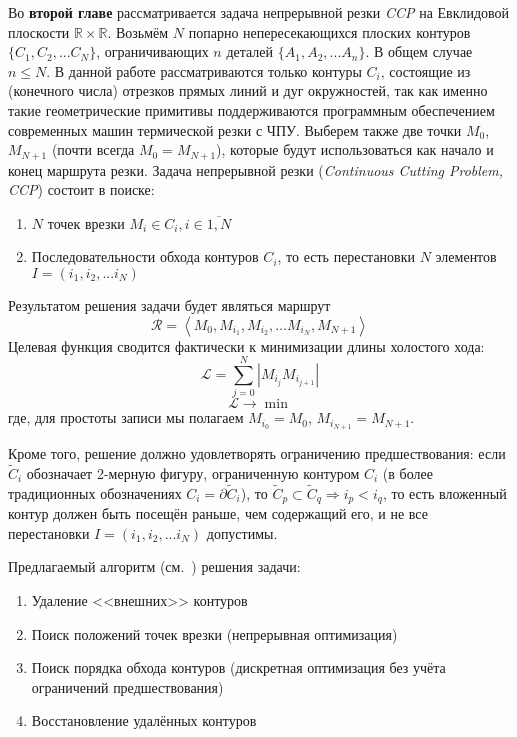 
Во {\bf второй главе}
рассматривается задача непрерывной резки {\it CCP}
на Евклидовой плоскости
$\mathbb R \times \mathbb R$.
Возьмём
$N$
попарно непересекающихся плоских контуров
$\{C_1, C_2, ... C_N\}$,
ограничивающих
$n$
деталей
$\{A_1, A_2, ... A_n\}$.
В общем случае
$n \leqslant N$.
В данной работе рассматриваются только контуры
$C_i$,
состоящие из
(конечного числа)
отрезков прямых линий и дуг окружностей,
так как именно такие геометрические примитивы
поддерживаются программным обеспечением
современных машин термической резки с ЧПУ.
Выберем также две точки
$M_0$, $M_{N + 1}$
(почти всегда $M_0 = M_{N + 1}$),
которые будут использоваться
как начало и конец
маршрута резки.
Задача непрерывной резки
({\it Continuous Cutting Problem, CCP})
состоит в поиске:
\begin{enumerate}
\item
$N$ точек врезки $M_i \in C_i, i \in \overline{1, N}$
\item
Последовательности обхода контуров
$C_i$,
то есть перестановки
$N$
элементов
$I = (i_1, i_2, ... i_N)$
\end{enumerate}
Результатом решения задачи будет являться маршрут
\begin{equation}
  \label{eq:route}
  \mathcal R =
  \left<M_0, M_{i_1}, M_{i_2}, \dots M_{i_N}, M_{N + 1}\right>
\end{equation}
Целевая функция
сводится фактически к минимизации длины холостого хода:
\begin{equation}
  \mathcal{L} = \sum_{j=0}^N|M_{i_j}M_{i_{j+1}}|
  \label{air-move-length}
\end{equation}
$$
\mathcal{L} \to \min
$$
где, для простоты записи мы полагаем
$M_{i_0} = M_0$,
$M_{i_{N + 1}} = M_{N + 1}$.

Кроме того, решение должно удовлетворять ограничению предшествования:
если
$\widetilde C_i$
обозначает 2-мерную фигуру,
ограниченную контуром
$C_i$
(в более традиционных обозначениях
$C_i = \partial \widetilde C_i$),
то
$
 \widetilde C_p \subset \widetilde C_q \Rightarrow i_p < i_q
$,
то есть вложенный контур должен быть посещён раньше,
чем содержащий его,
и не все перестановки
$I = (i_1, i_2, ... i_N)$
допустимы.

Предлагаемый алгоритм
(см.~\cite{berlin2019,bi:ccp:ru})
решения задачи:

\begin{enumerate}
  \item Удаление <<внешних>> контуров
  \item Поиск положений точек врезки (непрерывная оптимизация)
  \item Поиск порядка обхода контуров (дискретная оптимизация без учёта ограничений предшествования)
  \item Восстановление удалённых контуров
\end{enumerate}

